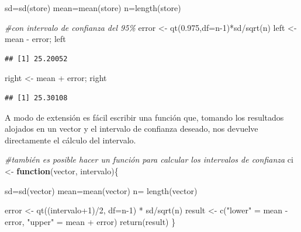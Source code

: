 \documentclass[
]{book}
\newenvironment{Shaded}{\begin{snugshade}}{\end{snugshade}}
\newcommand{\AttributeTok}[1]{\textcolor[rgb]{0.77,0.63,0.00}{#1}}
\newcommand{\CommentTok}[1]{\textcolor[rgb]{0.56,0.35,0.01}{\textit{#1}}}
\newcommand{\ControlFlowTok}[1]{\textcolor[rgb]{0.13,0.29,0.53}{\textbf{#1}}}
\newcommand{\DecValTok}[1]{\textcolor[rgb]{0.00,0.00,0.81}{#1}}
\newcommand{\FloatTok}[1]{\textcolor[rgb]{0.00,0.00,0.81}{#1}}
\newcommand{\FunctionTok}[1]{\textcolor[rgb]{0.00,0.00,0.00}{#1}}
\newcommand{\NormalTok}[1]{#1}
\newcommand{\OtherTok}[1]{\textcolor[rgb]{0.56,0.35,0.01}{#1}}
\newcommand{\SpecialCharTok}[1]{\textcolor[rgb]{0.00,0.00,0.00}{#1}}
\newcommand{\StringTok}[1]{\textcolor[rgb]{0.31,0.60,0.02}{#1}}
\begin{document}
\begin{Shaded}
\begin{Highlighting}[]
\NormalTok{sd}\OtherTok{=}\FunctionTok{sd}\NormalTok{(store)}
\NormalTok{mean}\OtherTok{=}\FunctionTok{mean}\NormalTok{(store)}
\NormalTok{n}\OtherTok{=}\FunctionTok{length}\NormalTok{(store)}

\CommentTok{\#con intervalo de confianza del 95\%}
\NormalTok{error }\OtherTok{\textless{}{-}} \FunctionTok{qt}\NormalTok{(}\FloatTok{0.975}\NormalTok{,}\AttributeTok{df=}\NormalTok{n}\DecValTok{{-}1}\NormalTok{)}\SpecialCharTok{*}\NormalTok{sd}\SpecialCharTok{/}\FunctionTok{sqrt}\NormalTok{(n)}
\NormalTok{left }\OtherTok{\textless{}{-}}\NormalTok{ mean }\SpecialCharTok{{-}}\NormalTok{ error; left}
\end{Highlighting}
\end{Shaded}

\begin{verbatim}
## [1] 25.20052
\end{verbatim}

\begin{Shaded}
\begin{Highlighting}[]
\NormalTok{right }\OtherTok{\textless{}{-}}\NormalTok{ mean }\SpecialCharTok{+}\NormalTok{ error; right}
\end{Highlighting}
\end{Shaded}

\begin{verbatim}
## [1] 25.30108
\end{verbatim}

A modo de extensión es fácil escribir una función que, tomando los resultados alojados en un vector y el intervalo de confianza deseado, nos devuelve directamente el cálculo del intervalo.

\begin{Shaded}
\begin{Highlighting}[]
\CommentTok{\#también es posible hacer un función para calcular los intervalos de confianza}
\NormalTok{ci }\OtherTok{\textless{}{-}} \ControlFlowTok{function}\NormalTok{(vector, intervalo)\{}
  
\NormalTok{  sd}\OtherTok{=}\FunctionTok{sd}\NormalTok{(vector)}
\NormalTok{  mean}\OtherTok{=}\FunctionTok{mean}\NormalTok{(vector)}
\NormalTok{  n}\OtherTok{=} \FunctionTok{length}\NormalTok{(vector)}
  
\NormalTok{  error }\OtherTok{\textless{}{-}} \FunctionTok{qt}\NormalTok{((intervalo}\SpecialCharTok{+}\DecValTok{1}\NormalTok{)}\SpecialCharTok{/}\DecValTok{2}\NormalTok{, }\AttributeTok{df=}\NormalTok{n}\DecValTok{{-}1}\NormalTok{) }\SpecialCharTok{*}\NormalTok{ sd}\SpecialCharTok{/}\FunctionTok{sqrt}\NormalTok{(n)}
\NormalTok{  result }\OtherTok{\textless{}{-}} \FunctionTok{c}\NormalTok{(}\StringTok{"lower"} \OtherTok{=}\NormalTok{ mean }\SpecialCharTok{{-}}\NormalTok{ error, }\StringTok{"upper"} \OtherTok{=}\NormalTok{ mean }\SpecialCharTok{+}\NormalTok{ error)}
  \FunctionTok{return}\NormalTok{(result)}
\NormalTok{\}}
\end{Highlighting}
\end{Shaded}
\end{document}
